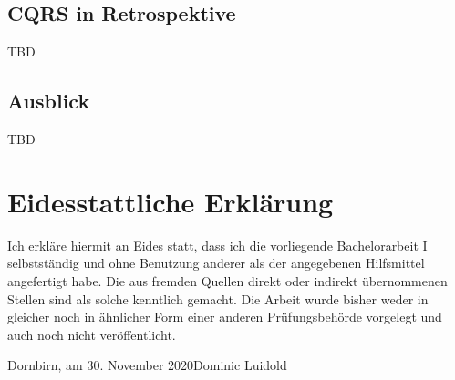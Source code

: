 \documentclass[a4paper,12pt,twoside]{scrreprt}
\begin{document}
\section{CQRS in Retrospektive}
\label{sec:cqrs-retrospektive}
TBD

\section{Ausblick}
\label{sec:ausblick}
TBD

\clearpage
{}
{}
\printbibliography

\chapter*{Eidesstattliche Erklärung}
Ich erkläre hiermit an Eides statt, dass ich die vorliegende Bachelorarbeit I selbstständig und ohne Benutzung anderer als der angegebenen Hilfsmittel angefertigt habe. Die aus fremden Quellen direkt oder indirekt übernommenen Stellen sind als solche kenntlich gemacht. Die Arbeit wurde bisher weder in gleicher noch in ähnlicher Form einer anderen Prüfungsbehörde vorgelegt und auch noch nicht veröffentlicht.

\vspace{5cm}
\noindent
Dornbirn, am 30. November 2020\hfill Dominic Luidold
\end{document}

